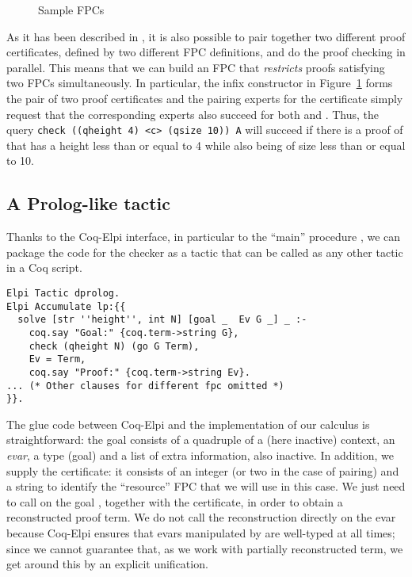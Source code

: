 \begin{figure}[t]


\caption{Sample FPCs}
\label{fig:resources}
\end{figure}

As it has been described in \cite{blanco17cade}, it is also possible
to pair together two different proof certificates, defined by two
different FPC definitions, and do the proof checking in parallel.
This means that we can build an FPC that \emph{restricts} proofs
satisfying two FPCs simultaneously.  In particular, the infix
constructor  in Figure~\ref{fig:resources} forms the pair of
two proof certificates and the pairing experts for the certificate
 simply request that the corresponding experts
also succeed for both  and . Thus, the query
\verb+check ((qheight 4) <c> (qsize 10)) A+ will succeed if there is a
proof of  that has a height less than or equal to 4 while also
being of size less than or equal to 10.



\subsection{A Prolog-like tactic}

Thanks to the Coq-Elpi interface, in particular to the ``main''
procedure , we can package the \lP code for the checker
as a tactic that can be called as any other tactic in a Coq script.

\begin{lstlisting}[deletekeywords={goal}]
Elpi Tactic dprolog.
Elpi Accumulate lp:{{
  solve [str ''height'', int N] [goal _  Ev G _] _ :-
    coq.say "Goal:" {coq.term->string G},
    check (qheight N) (go G Term),
    Ev = Term,
    coq.say "Proof:" {coq.term->string Ev}.
... (* Other clauses for different fpc omitted *)
}}.
\end{lstlisting}

The glue code between Coq-Elpi and the implementation of our calculus
is straightforward: the goal consists of a quadruple of a (here
inactive) context, an \emph{evar}, a type (goal) and a list of extra
information, also inactive. In addition, we supply the certificate: it
consists of an integer (or two in the case of pairing) and a string to
identify the ``resource'' FPC that we will use in this case. We just
need to call  on the goal , together with the
certificate, in order to obtain a reconstructed proof term. We do not
call the reconstruction directly on the evar because Coq-Elpi ensures
that evars manipulated by \lP are well-typed at all times; since we
cannot guarantee that, as we work with partially reconstructed term,
we get around this by an explicit unification.

